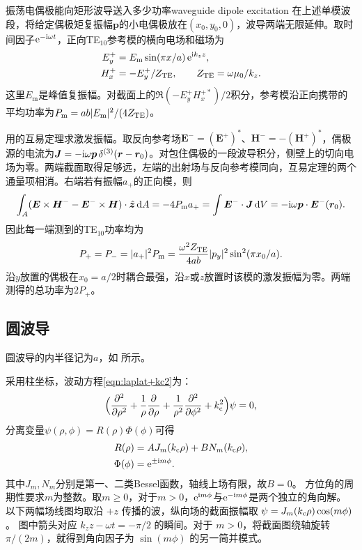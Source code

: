 \begin{example}{振荡电偶极能向矩形波导送入多少功率}{waveguide dipole excitation}
    在上述单模波段，将给定偶极矩复振幅$\bm p$的小电偶极放在$(x_0,y_0,0)$，波导两端无限延伸。取时间因子$\e^{-\i\omega t}$，正向TE$_{10}$参考模的横向电场和磁场为
    \begin{align*}
        E_y^+ &= E_{\mathrm{m}}\sin(\pi x/a)\e^{\i k_z z},\\
        H_x^+ &= -E_y^+/Z_{\mathrm{TE}},\qquad Z_{\mathrm{TE}} = \omega\mu_0/k_z .
    \end{align*}
    这里$E_{\mathrm{m}}$是峰值复振幅。对截面上的$\Re(-E_y^+H_x^{+*})/2$积分，参考模沿正向携带的平均功率为$P_{\mathrm{m}} = ab\abs{E_{\mathrm{m}}}^2/(4Z_{\mathrm{TE}})$。

    用的互易定理求激发振幅。取反向参考场$\bm E^- = (\bm E^+)^*$、$\bm H^- = -(\bm H^+)^*$，偶极源的电流为$\bm J = -\i\omega\bm p\,\delta^{(3)}(\bm r - \bm r_0)$。对包住偶极的一段波导积分，侧壁上的切向电场为零。两端截面取得足够远，左端的出射场与反向参考模同向，互易定理的两个通量项相消。右端若有振幅$a_+$的正向模，则
    \[
        \int_A(\bm E \times \bm H^- - \bm E^- \times \bm H) \cdot \uvec z\d A
        = -4P_{\mathrm{m}} a_+ = \int\bm E^- \cdot \bm J\d V
        = -\i\omega\bm p \cdot \bm E^-(\bm r_0).
    \]
    因此每一端测到的TE$_{10}$功率均为
    \begin{equation}
        \label{eq:ed-dipole-te10-emitted-power}
        P_+ = P_- = \abs{a_+}^2P_{\mathrm{m}}
          = \frac{\omega^2 Z_{\mathrm{TE}}}{4ab}\abs{p_y}^2\sin^2(\pi x_0/a).
    \end{equation}
    沿$y$放置的偶极在$x_0 = a/2$时耦合最强，沿$x$或$z$放置时该模的激发振幅为零。两端测得的总功率为$2P_+$。
\end{example}

\subsection{圆波导}

圆波导的内半径记为$a$，如 所示。
\begin{notecaptionblock}
    \label{fig:circle waveguide}
\end{notecaptionblock}
采用柱坐标，波动方程\eqref{eqn:laplat+kc2}为：
\begin{equation}
    \Bigp{\pp[2]\rho + \frac1\rho\pp\rho + \frac1{\rho^2}\pp[2]\phi + k_\cutoff^2}\psi = 0,
\end{equation}
分离变量$\psi(\rho,\phi) = R(\rho)\Phi(\phi)$可得
\begin{align*}
    R(\rho) &= AJ_m(k_\cutoff\rho) + BN_m(k_\cutoff\rho),\\
    \Phi(\phi) &= \e^{\pm\i m\phi}.
\end{align*}
其中$J_m,N_m$分别是第一、二类Bessel函数，轴线上场有限，故$B = 0$。
方位角的周期性要求$m$为整数。取$m \geq 0$，对于$m > 0$，$\e^{\i m\phi}$与$\e^{-\i m\phi}$是两个独立的角向解。
以下两幅场线图均取沿 $+z$ 传播的波，纵向场的截面振幅取 $\psi = J_m(k_\cutoff\rho)\cos(m\phi)$。
图中箭头对应 $k_z z - \omega t = -\pi/2$ 的瞬间。对于 $m > 0$，将截面图绕轴旋转 $\pi/(2m)$，就得到角向因子为 $\sin(m\phi)$ 的另一简并模式。

